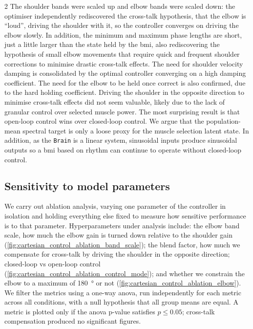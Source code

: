 \documentclass[a4paper, 10pt]{article}
\newcommand{\Brain}{\texttt{Brain}\xspace}
\newcommand{\BMI}{\ac{bmi}\xspace}
\begin{document}
\begin{multicols*}{2}
  The shoulder bands were scaled up and elbow bands were scaled down: the
  optimiser independently rediscovered the cross-talk hypothesis, that the elbow
  is ``loud'', driving the shoulder with it, so the controller converges on
  driving the elbow slowly. In addition, the minimum and maximum phase lengths
  are short, just a little larger than the state held by the \BMI, also
  rediscovering the hypothesis of small elbow movements that require quick and
  frequent shoulder corrections to minimise drastic cross-talk effects. The need
  for shoulder velocity damping is consolidated by the optimal controller
  converging on a high damping coefficient. The need for the elbow to be held
  once correct is also confirmed, due to the hard holding coefficient. Driving the shoulder in the opposite direction to minimise
  cross-talk effects did not seem valuable, likely due to the lack of
  granular control over selected muscle power. The most surprising result is
  that open-loop control wins over closed-loop control. We argue that the
  population-mean spectral target is only a loose proxy for the muscle selection
  latent state. In addition, as the \Brain is a linear system, sinusoidal inputs
  produce sinusoidal outputs so a \BMI based on rhythm can continue to operate
  without closed-loop control.


  \subsection*{Sensitivity to model parameters}

  We carry out ablation analysis, varying one parameter of the controller in
  isolation and holding everything else fixed to measure how sensitive
  performance is to that parameter. Hyperparameters under analysis include: the
  elbow band scale, how much the elbow gain is turned down relative to the
  shoulder gain (\autoref{fig:cartesian_control_ablation_band_scale}); the blend
  factor, how much we compensate for cross-talk by driving the shoulder in the
  opposite direction; closed-loop vs open-loop control
  (\autoref{fig:cartesian_control_ablation_control_mode}); and whether we
  constrain the elbow to a maximum of \SI{180}{\degree} or not
  (\autoref{fig:cartesian_control_ablation_elbow}). We filter the metrics using a
  one-way \ac{anova}, run independently for each metric across all conditions,
  with a null hypothesis that all group means are equal. A metric is plotted
  only if the \ac{anova} p-value satisfies $p \le 0.05$; cross-talk compensation
  produced no significant figures.


\end{multicols*}
\end{document}

